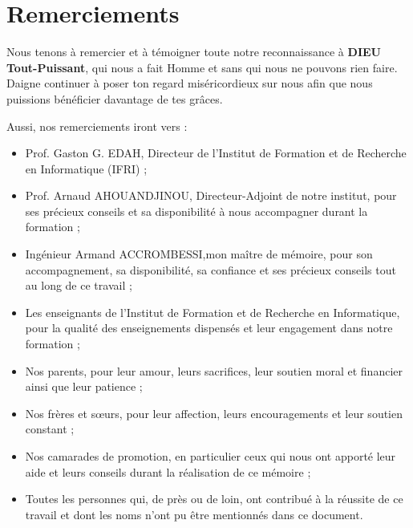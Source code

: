 \clearpage
\chapter*{Remerciements}
\thispagestyle{plain}

\vspace{1.2cm}

\noindent
Nous tenons à remercier et à témoigner toute notre reconnaissance à
\textbf{DIEU Tout-Puissant}, qui nous a fait Homme et sans qui nous ne
pouvons rien faire. Daigne continuer à poser ton regard miséricordieux
sur nous afin que nous puissions bénéficier davantage de tes grâces.

\vspace{0.4cm}

\noindent
Aussi, nos remerciements iront vers :

\vspace{0.2cm}

\begin{itemize}
    \setlength{\itemsep}{0.35cm}

    \item Prof. Gaston G. EDAH, Directeur de l'Institut de Formation et de Recherche en Informatique (IFRI) ;

    \item Prof. Arnaud AHOUANDJINOU, Directeur-Adjoint de notre institut, pour ses précieux conseils et sa disponibilité à nous accompagner durant la formation ;

    \item Ingénieur Armand ACCROMBESSI,mon maître de mémoire, pour son accompagnement, sa disponibilité, sa confiance et ses précieux conseils tout au long de ce travail ;

    \item Les enseignants de l'Institut de Formation et de Recherche en Informatique, pour la qualité des enseignements dispensés et leur engagement dans notre formation ;

    \item Nos parents, pour leur amour, leurs sacrifices, leur soutien moral et financier ainsi que leur patience ;

    \item Nos frères et sœurs, pour leur affection, leurs encouragements et leur soutien constant ;

    \item Nos camarades de promotion, en particulier ceux qui nous ont apporté leur aide et leurs conseils durant la réalisation de ce mémoire ;

    \item Toutes les personnes qui, de près ou de loin, ont contribué à la réussite de ce travail et dont les noms n'ont pu être mentionnés dans ce document.
\end{itemize}